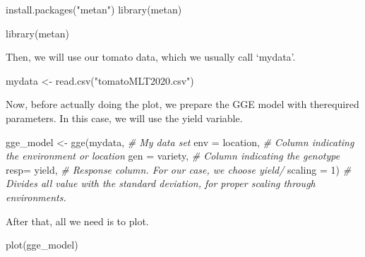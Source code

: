 \documentclass[
]{book}
\newenvironment{Shaded}{\begin{snugshade}}{\end{snugshade}}
\newcommand{\AttributeTok}[1]{\textcolor[rgb]{0.77,0.63,0.00}{#1}}
\newcommand{\CommentTok}[1]{\textcolor[rgb]{0.56,0.35,0.01}{\textit{#1}}}
\newcommand{\DecValTok}[1]{\textcolor[rgb]{0.00,0.00,0.81}{#1}}
\newcommand{\FunctionTok}[1]{\textcolor[rgb]{0.00,0.00,0.00}{#1}}
\newcommand{\NormalTok}[1]{#1}
\newcommand{\OtherTok}[1]{\textcolor[rgb]{0.56,0.35,0.01}{#1}}
\newcommand{\StringTok}[1]{\textcolor[rgb]{0.31,0.60,0.02}{#1}}
\begin{document}
\begin{Shaded}
\begin{Highlighting}[]
\FunctionTok{install.packages}\NormalTok{(}\StringTok{"metan"}\NormalTok{)}
\FunctionTok{library}\NormalTok{(metan)}
\end{Highlighting}
\end{Shaded}

\begin{Shaded}
\begin{Highlighting}[]
\FunctionTok{library}\NormalTok{(metan)}
\end{Highlighting}
\end{Shaded}

Then, we will use our tomato data, which we usually call `mydata'.

\begin{Shaded}
\begin{Highlighting}[]
\NormalTok{mydata }\OtherTok{\textless{}{-}} \FunctionTok{read.csv}\NormalTok{(}\StringTok{"tomatoMLT2020.csv"}\NormalTok{)}
\end{Highlighting}
\end{Shaded}

Now, before actually doing the plot, we prepare the GGE model with therequired parameters. In this case, we will use the yield variable.

\begin{Shaded}
\begin{Highlighting}[]
\NormalTok{gge\_model }\OtherTok{\textless{}{-}}  \FunctionTok{gge}\NormalTok{(mydata,             }\CommentTok{\# My data set }
                  \AttributeTok{env =}\NormalTok{ location,     }\CommentTok{\# Column indicating the environment or location}
                  \AttributeTok{gen =}\NormalTok{ variety,      }\CommentTok{\# Column indicating the genotype}
                  \AttributeTok{resp=}\NormalTok{ yield,        }\CommentTok{\# Response column. For our case, we choose yield/}
                  \AttributeTok{scaling =} \DecValTok{1}\NormalTok{)        }\CommentTok{\# Divides all value with the standard deviation, for proper scaling through environments.}
\end{Highlighting}
\end{Shaded}

After that, all we need is to plot.

\begin{Shaded}
\begin{Highlighting}[]
\FunctionTok{plot}\NormalTok{(gge\_model)}
\end{Highlighting}
\end{Shaded}
\end{document}

